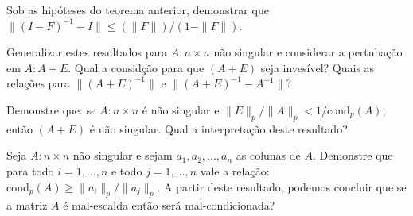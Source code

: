 \documentclass[a4paper,12pt, leqno, answers]{exam}
\begin{document}
\begin{questions}
\begin{solution}
    \end{solution}

    \question Sob as hip\'{o}teses do teorema anterior, demonstrar que $\| \left( I - F \right)^{-1} - I \| \leq \left( \| F \| \right) / \left( 1 - \| F \| \right)$.
    \begin{solution}
        
    \end{solution}

    \question Generalizar estes resultados para $A : n \times n$ n\~{a}o singular e considerar a pertuba\c{c}\~{a}o em $A : A + E$. Qual a consid\c{c}\~{a}o para que $\left( A + E \right)$ seja inves\'{i}vel? Quais as rela\c{c}\~{o}es para $\| \left( A + E \right)^{-1} \|$ e $\| \left( A + E \right)^{-1} - A^{-1} \|$?
    \begin{solution}
        
    \end{solution}

    \question Demonstre que: se $A : n \times n$ \'{e} n\~{a}o singular e $\| E \|_p / \| A \|_p < 1 / \text{cond}_p (A)$, ent\~{a}o $(A + E)$ \'{e} n\~{a}o singular. Qual a interpreta\c{c}\~{a}o deste resultado?
    \begin{solution}
        
    \end{solution}

    \question Seja $A : n \times n$ n\~{a}o singular e sejam $a_1, a_2, \ldots, a_n$ as colunas de $A$. Demonstre que para todo $i = 1, \ldots, n$ e todo $j = 1, \ldots, n$ vale a rela\c{c}\~{a}o: $\text{cond}_p (A) \geq \| a_i \|_p / \| a_j \|_p$. A partir deste resultado, podemos concluir que se a matriz $A$ \'{e} mal-escalda ent\~{a}o ser\'{a} mal-condicionada?
    \begin{solution}
        
    \end{solution}
\end{questions}


\end{document}

